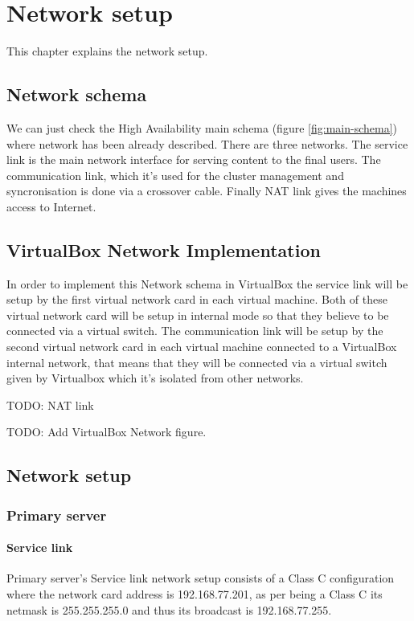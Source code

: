 

\chapter{Network setup}
\label{chap:network-setup}
This chapter explains the network setup.

\section {Network schema}
We can just check the High Availability main schema (figure \ref{fig:main-schema}) where network has been already described. There are three networks. The service link is the main network interface for serving content to the final users. The communication link, which it's used for the cluster management and syncronisation is done via a crossover cable. Finally NAT link gives the machines access to Internet.

\section {VirtualBox Network Implementation}

In order to implement this Network schema in VirtualBox the service link will be setup by the first virtual network card in each virtual machine. Both of these virtual network card will be setup in internal mode so that they believe to be connected via a virtual switch. The communication link will be setup by the second virtual network card in each virtual machine connected to a VirtualBox internal network, that means that they will be connected via a virtual switch given by Virtualbox which it's isolated from other networks.

TODO: NAT link

TODO: Add VirtualBox Network figure.


\section {Network setup}

\subsection {Primary server}
\subsubsection {Service link}
Primary server's Service link network setup consists of a Class C configuration where the network card address is 192.168.77.201, as per being a Class C its netmask is 255.255.255.0 and thus its broadcast is 192.168.77.255.

